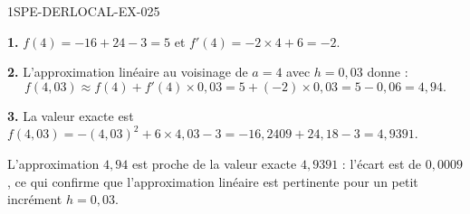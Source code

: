 \begin{corrige}{1SPE-DERLOCAL-EX-025}

\textbf{1.} $f(4)=-16+24-3=5$ et $f'(4)=-2\times 4+6=-2$.

\textbf{2.} L'approximation linéaire au voisinage de $a=4$ avec $h=0{,}03$ donne :
\[
f(4{,}03)\approx f(4)+f'(4)\times 0{,}03=5+(-2)\times 0{,}03=5-0{,}06=4{,}94.
\]

\textbf{3.} La valeur exacte est $f(4{,}03)=-(4{,}03)^2+6\times 4{,}03-3=-16{,}2409+24{,}18-3=4{,}9391$.

L'approximation $4{,}94$ est proche de la valeur exacte $4{,}9391$ : l'écart est de $0{,}0009$, ce qui confirme que l'approximation linéaire est pertinente pour un petit incrément $h=0{,}03$.
\end{corrige}
